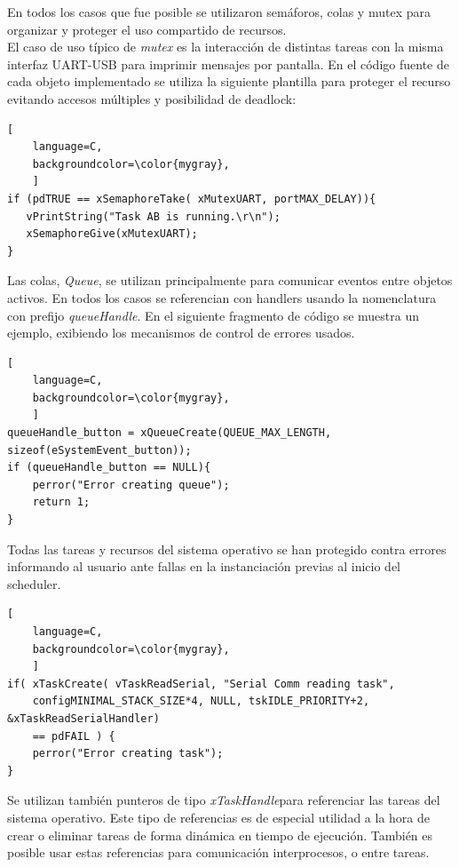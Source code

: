 En todos los casos que fue posible se utilizaron semáforos, colas y mutex para organizar y proteger el uso compartido de recursos. \\

El caso de uso típico de \textit{mutex} es la interacción de distintas tareas con la misma interfaz UART-USB para imprimir mensajes por pantalla. En el código fuente de cada objeto implementado se utiliza la siguiente plantilla para proteger el recurso evitando accesos múltiples y posibilidad de deadlock:\\

\begin{lstlisting}[
	language=C, 
	backgroundcolor=\color{mygray},
	]
if (pdTRUE == xSemaphoreTake( xMutexUART, portMAX_DELAY)){
   vPrintString("Task AB is running.\r\n");
   xSemaphoreGive(xMutexUART);
}
\end{lstlisting}

Las colas, \textit{Queue}, se utilizan principalmente para comunicar eventos entre objetos activos. En todos los casos se referencian con handlers usando la nomenclatura con prefijo \textit{queueHandle}. En el siguiente fragmento de código se muestra un ejemplo, exibiendo los mecanismos de control de errores usados. \\

\begin{lstlisting}[
	language=C, 
	backgroundcolor=\color{mygray},
	]
queueHandle_button = xQueueCreate(QUEUE_MAX_LENGTH, sizeof(eSystemEvent_button));
if (queueHandle_button == NULL){
    perror("Error creating queue");
    return 1;
}
\end{lstlisting}


Todas las tareas y recursos del sistema operativo se han protegido contra errores informando al usuario ante fallas en la instanciación previas al inicio del scheduler.

\begin{lstlisting}[
	language=C, 
	backgroundcolor=\color{mygray},
	]
if( xTaskCreate( vTaskReadSerial, "Serial Comm reading task", 
    configMINIMAL_STACK_SIZE*4, NULL, tskIDLE_PRIORITY+2, &xTaskReadSerialHandler) 
    == pdFAIL ) {
    perror("Error creating task");
}
\end{lstlisting}

Se utilizan también punteros de tipo \textit{xTaskHandle}para referenciar las tareas del sistema operativo. Este tipo de referencias es de especial utilidad a la hora de crear o eliminar tareas de forma dinámica en tiempo de ejecución. También es posible usar estas referencias para comunicación interprocesos, o entre tareas.\\

